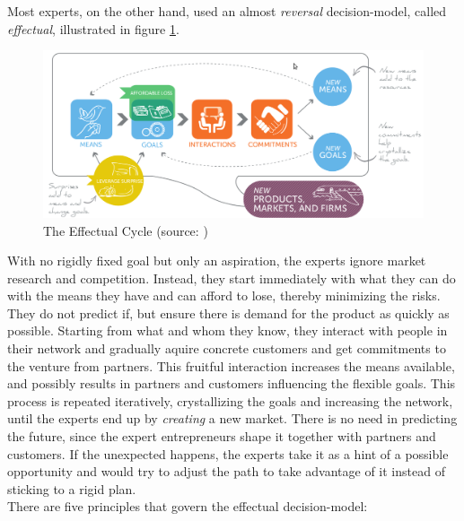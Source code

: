 \documentclass[a4paper,10pt]{article}
\begin{document}
Most experts, on the other hand, used an almost \emph{reversal} decision-model, called \emph{effectual}, illustrated in figure \ref{fig:effectualCycle}. \\

\begin{figure}[here]
\includegraphics[width=1.1\textwidth]{images/effectuationCycle.png}
 \caption{The Effectual Cycle (source: \cite{effectualCycle})}
\label{fig:effectualCycle}
\end{figure}


With no rigidly fixed goal but only an aspiration, the experts ignore market research and competition. Instead, they start immediately with 
what they can do with the means they have and can afford to lose, thereby minimizing the risks. 
They do not predict if, but ensure there is demand for the product as quickly as possible. 
Starting from what and whom they know, they interact with people in their network and gradually aquire concrete customers and get commitments 
to the venture from partners. 
This fruitful interaction increases the means available, and possibly results in partners and customers influencing the flexible goals. 
This process is repeated iteratively, crystallizing the goals and increasing the network, until the experts end up by \emph{creating} a new market. 
There is no need in predicting the future, since the expert entrepreneurs shape it together with partners and customers.
If the unexpected happens, the experts take it as a hint of a possible opportunity and would try to adjust the path to take advantage of it instead of sticking to a rigid plan.
\\

There are five principles that govern the effectual decision-model:
\end{document}
